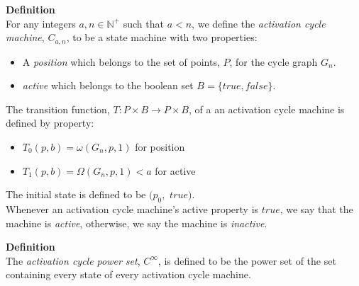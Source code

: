 \documentclass[a4paper,12pt]{article}
\begin{document}
\label{definition:cycle_machine}
\hypertarget{definition:cycle_machine}{}
\begin{tcolorbox}
\textbf{Definition}\\
For any integers $a, n \in \mathbb{N^+}$ such that $a < n$, we define the \textit{activation cycle machine}, $C_{a, n}$, to be a state machine with two properties:

\begin{itemize}
\item A \textit{position} which belongs to the set of points, $P$, for the cycle graph $G_n$.

\item \textit{active} which belongs to the boolean set $B = \{true, false\}$.
\end{itemize}

The transition function, $T: P \times B \rightarrow P \times B$, of a an activation cycle machine is defined by property:
\begin{itemize}
\item $T_0(p, b) = \omega(G_n, p, 1)$ for position
\item $T_1(p, b) = \Omega(G_n, p, 1) < a$ for active
\end{itemize}

The initial state is defined to be $(p_0,$ $true)$.\\

\noindent Whenever an activation cycle machine's active property is $true$, we say that the machine is \textit{active}, otherwise, we say the machine is \textit{inactive}.

\end{tcolorbox}






\label{definition:cycle_machine}
\hypertarget{definition:cycle_machine}{}
\begin{tcolorbox}
\textbf{Definition}\\
The \textit{activation cycle power set}, $C^{\infty}$, is defined to be the power set of the set containing every state of every activation cycle machine.
\end{tcolorbox}
\end{document}
